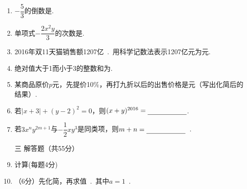 \documentclass[11pt,twoside]{ctexart}
\begin{document}
\begin{enumerate}
\item $-\dfrac{5}{3}$的倒数是.
\item 单项式$-\dfrac{2x^2y}{3}$的次数是.
\item 2016年双11天猫销售额1207亿~.~用科学记数法表示1207亿元为元.

\item 绝对值大于1而小于3的整数和为.

\item 某商品原价$p$元，先提价10\%，再打九折以后的出售价格是元（写出化简后的结果）.
\item 若$|x+3|+(y-2)^2=0$，则$(x+y)^{2016}=\line{2}$.
\item 若$3x^ny^{2m+1}$与$-\dfrac{1}{2}xy^3$是同类项，则$m+n=\line{2}$~.


\item[\kaishu{}三]{\kaishu{}\dafenlan{}解答题（共55分）}%
\item {\kaishu{}计算(每题4分)}\par
{}
\vfill
{}
\vfill
\newpage
%
%
\item （6分）先化简，再求值~.~其中$a=1$~.\\
\vfill


\end{enumerate}
\end{document}
